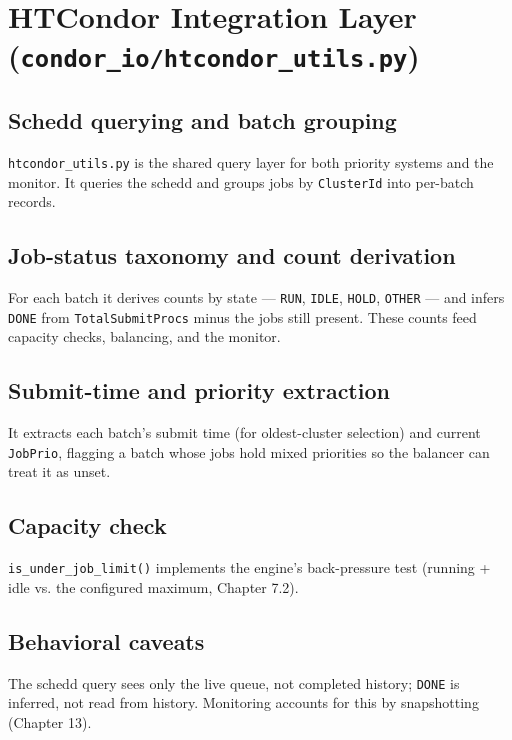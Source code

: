 \section{HTCondor Integration Layer
(\texttt{condor\_\allowbreak{}io/\allowbreak{}htcondor\_\allowbreak{}utils.\allowbreak{}py})}\label{ch:12}

\subsection{Schedd querying and batch grouping}

\texttt{htcondor\_\allowbreak{}utils.\allowbreak{}py} is the shared query layer for both priority systems and
the monitor. It queries the schedd and groups jobs by \texttt{ClusterId} into per-batch records.

\subsection{Job-status taxonomy and count derivation}

For each batch it derives counts by state --- \texttt{RUN}, \texttt{IDLE}, \texttt{HOLD}, \texttt{OTHER} ---
and infers \texttt{DONE} from \texttt{TotalSubmitProcs} minus the jobs still present. These counts feed
capacity checks, balancing, and the monitor.

\subsection{Submit-time and priority extraction}

It extracts each batch's submit time (for oldest-cluster selection) and current \texttt{JobPrio}, flagging a
batch whose jobs hold mixed priorities so the balancer can treat it as unset.

\subsection{Capacity check}

\texttt{is\_\allowbreak{}under\_\allowbreak{}job\_\allowbreak{}limit()} implements the engine's back-pressure
test (running + idle vs. the configured maximum, Chapter 7.2).

\subsection{Behavioral caveats}

The schedd query sees only the live queue, not completed history; \texttt{DONE} is inferred, not read from
history. Monitoring accounts for this by snapshotting (Chapter 13).
